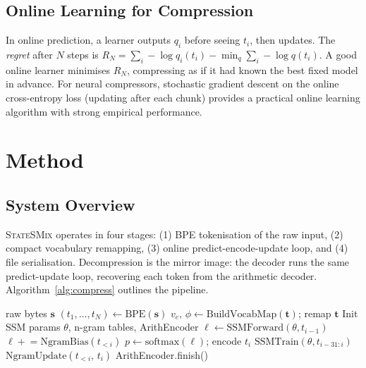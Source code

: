 \documentclass[10pt,twocolumn]{article}
\newcommand{\ssmcomp}{\textsc{StateSMix}}
\begin{document}
\subsection{Online Learning for Compression}

In online prediction, a learner outputs $q_i$ before seeing $t_i$,
then updates.  The \emph{regret} after $N$ steps is
$R_N = \sum_i -\log q_i(t_i) - \min_q \sum_i -\log q(t_i)$.
A good online learner minimises $R_N$, compressing as if it had known
the best fixed model in advance.  For neural compressors, stochastic
gradient descent on the online cross-entropy loss (updating after each
chunk) provides a practical online learning algorithm with strong
empirical performance.

\section{Method}
\label{sec:method}

\subsection{System Overview}

\ssmcomp{} operates in four stages:
(1) BPE tokenisation of the raw input,
(2) compact vocabulary remapping,
(3) online predict-encode-update loop, and
(4) file serialisation.
Decompression is the mirror image: the decoder runs the same
predict-update loop, recovering each token from the arithmetic decoder.
Algorithm~\ref{alg:compress} outlines the pipeline.

\begin{algorithm}[H]
\caption{\ssmcomp{} compression}
\label{alg:compress}
\begin{algorithmic}[1]
\REQUIRE raw bytes $\mathbf{s}$
\STATE $(t_1,\ldots,t_N) \leftarrow \mathrm{BPE}(\mathbf{s})$
\STATE $v_e,\,\phi \leftarrow \mathrm{BuildVocabMap}(\mathbf{t})$; remap $\mathbf{t}$
\STATE Init SSM params $\theta$, n-gram tables, ArithEncoder
  \STATE $\boldsymbol{\ell} \leftarrow \mathrm{SSMForward}(\theta, t_{i-1})$
  \STATE $\boldsymbol{\ell} \mathrel{+}= \mathrm{NgramBias}(t_{<i})$ 
  \STATE $p \leftarrow \mathrm{softmax}(\boldsymbol{\ell})$; encode $t_i$
    \STATE $\mathrm{SSMTrain}(\theta, t_{i-31:i})$ 
  \ENDIF
  \STATE $\mathrm{NgramUpdate}(t_{<i},\, t_i)$
\ENDFOR
\RETURN ArithEncoder.finish()
\end{algorithmic}
\end{algorithm}
\end{document}

